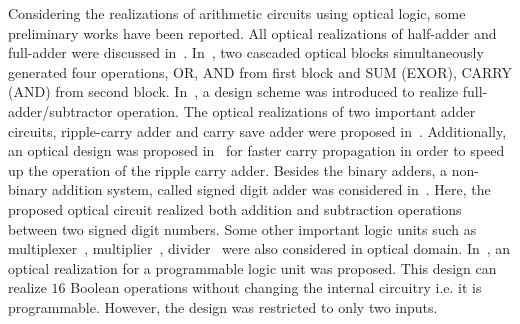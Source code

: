 \documentclass[10pt,letterpaper,twoside,openright]{book}
\begin{document}
Considering the realizations of arithmetic circuits using optical logic, some preliminary works have been reported. All optical realizations of half-adder and full-adder were discussed in~\cite{Gayen20132029,Nady201369,Tsiokos2004284}. In~\cite{Tsiokos2004284}, two cascaded optical blocks simultaneously generated four operations, OR, AND from first block and SUM (EXOR), CARRY (AND) from second block. In~\cite{kumar2014implementation}, a design scheme was introduced to realize full-adder/subtractor operation. The optical realizations of two important adder circuits, ripple-carry adder and carry save adder were proposed in~\cite{DattaCS15}. Additionally, an optical design was proposed in~\cite{DattaCS15} for faster carry propagation in order to speed up the operation of the ripple carry adder. Besides the binary adders, a non-binary addition system, called signed digit adder was considered in~\cite{cherri2010circuit}. Here, the proposed optical circuit realized both addition and subtraction operations between two signed digit numbers. Some other important logic units such as multiplexer~\cite{Datta2014}, multiplier~\cite{Mandal2014292}, divider~\cite{Aikawa2011} were also considered in optical domain. In~\cite{Chattopadhyay:11}, an optical realization for a programmable logic unit was proposed. This design can realize $16$ Boolean operations without changing the internal circuitry i.e. it is programmable. However, the design was restricted to only two inputs.  
 
\end{document}
